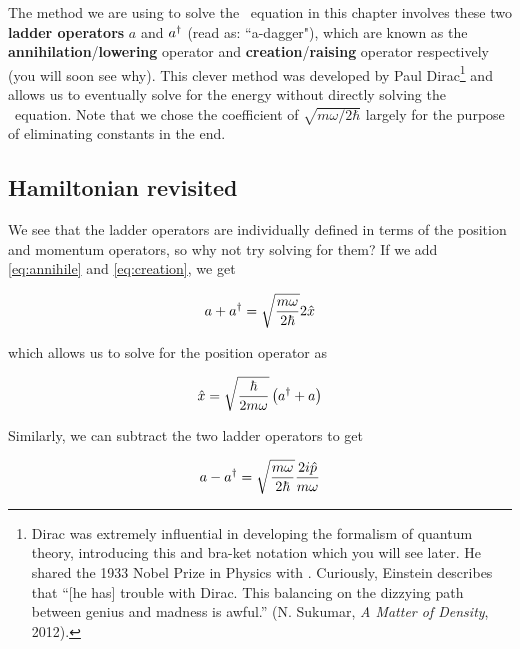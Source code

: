 The method we are using to solve the \Sch\ equation in this chapter involves these two \textbf{ladder operators} $a$ and $a^{\dagger}$ (read as: ``a-dagger"), which are known as the \textbf{annihilation}/\textbf{lowering} operator and \textbf{creation}/\textbf{raising} operator respectively (you will soon see why). 
This clever method was developed by Paul Dirac\footnote{Dirac was extremely influential in developing the formalism of quantum theory, introducing this and bra-ket notation which you will see later. He shared the 1933 Nobel Prize in Physics with \Sch. Curiously, Einstein describes that ``[he has] trouble with Dirac. This balancing on the dizzying path between genius and madness is awful.'' (N. Sukumar, \emph{A Matter of Density}, 2012).} and allows us to eventually solve for the energy without directly solving the \Sch\ equation. 
Note that we chose the coefficient of $\sqrt{m\omega/2\hbar}$ largely for the purpose of eliminating constants in the end.


\subsection{Hamiltonian revisited}

We see that the ladder operators are individually defined in terms of the position and momentum operators, so why not try solving for them? 
If we add \autoref{eq:annihile} and \ref{eq:creation}, we get 

\begin{equation*}
	a + a^{\dagger} = \sqrt{\frac{m\omega}{2\hbar}}2\hat{x}
\end{equation*}

\noindent which allows us to solve for the position operator as

\begin{tcolorbox}[title = Position operator] \vspace{-2ex}
	\begin{equation}
		\hat{x} = \sqrt{\frac{\hbar}{2m\omega}}\left(a^{\dagger} + a \right) \label{eq:x-op}
	\end{equation}
\end{tcolorbox}

Similarly, we can subtract the two ladder operators to get

\begin{equation*}
	a - a^{\dagger} = \sqrt{\frac{m\omega}{2\hbar}} \frac{2i\hat{p}}{m\omega}
\end{equation*}

